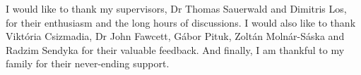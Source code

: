 \begin{acknowledgements}      


I would like to thank my supervisors, Dr Thomas Sauerwald and Dimitris Los, for their enthusiasm and the long hours of discussions. I would also like to thank Viktória Csizmadia, Dr John Fawcett, Gábor Pituk, Zoltán Molnár-Sáska and Radzim Sendyka for their valuable feedback. And finally, I am thankful to my family for their never-ending support.


\end{acknowledgements}
